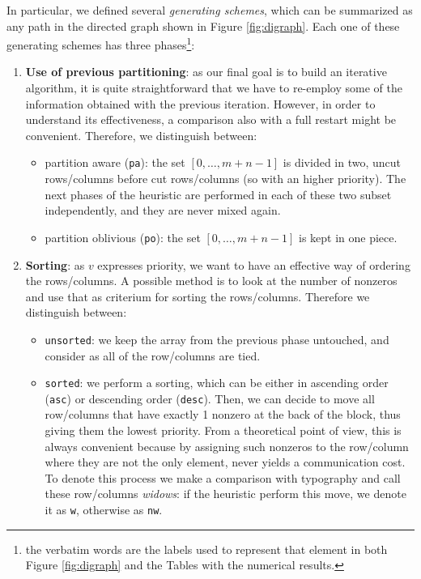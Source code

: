 In particular, we defined several \emph{generating schemes}, which can be summarized as any path in the directed graph shown in Figure \ref{fig:digraph}. Each one of these generating schemes has three phases\footnote{the verbatim words are the labels used to represent that element in both Figure \ref{fig:digraph} and the Tables with the numerical results.}:

\begin{enumerate}
 \item \textbf{Use of previous partitioning}: as our final goal is to build an iterative algorithm, it is quite straightforward that we have to re-employ some of the information obtained with the previous iteration. However, in order to understand its effectiveness, a comparison also with a full restart might be convenient. Therefore, we distinguish between:
 
  \begin{itemize}
 \item partition aware (\verb|pa|): the set $[0,\dots,m+n-1]$ is divided in two, uncut rows/columns before cut rows/columns (so with an higher priority). The next phases of the heuristic are performed in each of these two subset independently, and they are never mixed again.
 \item partition oblivious (\verb|po|): the set $[0,\dots,m+n-1]$ is kept in one piece.
 \end{itemize}

 \item \textbf{Sorting}: as $v$ expresses priority, we want to have an effective way of ordering the rows/columns. A possible method is to look at the number of nonzeros and use that as criterium for sorting the rows/columns. Therefore we distinguish between:
 
 \begin{itemize}
  \item \verb|unsorted|: we keep the array from the previous phase untouched, and consider as all of the row/columns are tied.
  \item \verb|sorted|: we perform a sorting, which can be either in ascending order (\verb|asc|) or descending order (\verb|desc|). Then, we can decide to move all row/columns that have exactly 1 nonzero at the back of the block, thus giving them the lowest priority. From a theoretical point of view, this is always convenient because by assigning such nonzeros to the row/column where they are not the only element, never yields a communication cost. To denote this process we make a comparison with typography and call these row/columns \emph{widows}: if the heuristic perform this move, we denote it as \verb|w|, otherwise as \verb|nw|.
 \end{itemize}


\end{enumerate}
